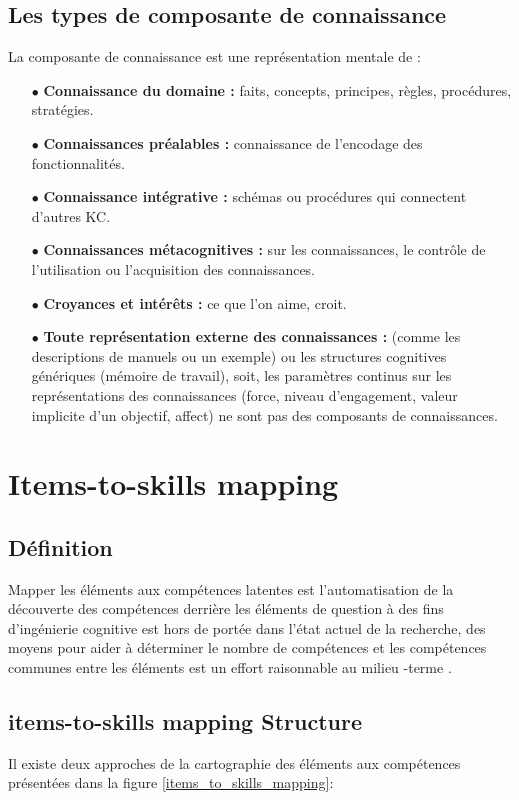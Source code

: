 \subsection{Les types de composante de connaissance}

La composante de connaissance est une représentation mentale de : \cite{chang2006learning}

\begin{itemize}
    \item[$\bullet$] \textbf{Connaissance du domaine :} faits, concepts, principes, règles, procédures, stratégies.
    \item[$\bullet$] \textbf{Connaissances préalables :} connaissance de l'encodage des fonctionnalités.
    \item[$\bullet$] \textbf{Connaissance intégrative :} schémas ou procédures qui connectent d'autres KC.
    \item[$\bullet$] \textbf{Connaissances métacognitives :} sur les connaissances, le contrôle de l'utilisation ou l'acquisition des connaissances.
    \item[$\bullet$] \textbf{Croyances et intérêts :} ce que l'on aime, croit.
    \item[$\bullet$] \textbf{Toute représentation externe des connaissances :} (comme les descriptions de manuels ou un exemple) ou les structures cognitives génériques (mémoire de travail), soit, les paramètres continus sur les représentations des connaissances (force, niveau d'engagement, valeur implicite d'un objectif, affect) ne sont pas des composants de connaissances.
\end{itemize}

\section{Items-to-skills mapping}
\subsection{Définition}
Mapper les éléments aux compétences latentes est l'automatisation de la découverte des compétences derrière les éléments de question à des fins d'ingénierie cognitive est hors de portée dans l'état actuel de la recherche, des moyens pour aider à déterminer le nombre de compétences et les compétences communes entre les éléments est un effort raisonnable au milieu -terme \cite{desmarais2013matrix}.

\subsection{items-to-skills mapping Structure}
Il existe deux approches de la cartographie des éléments aux compétences présentées dans la figure \ref{items_to_skills_mapping}:

